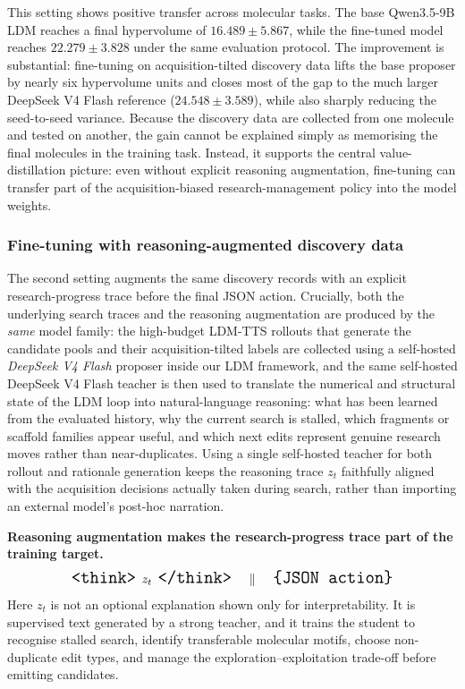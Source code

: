This setting shows positive transfer across molecular tasks. The base
Qwen3.5-9B LDM reaches a final hypervolume of $16.489\pm5.867$, while the fine-tuned model reaches
$22.279\pm3.828$ under the same evaluation protocol. The improvement is substantial: fine-tuning on
acquisition-tilted discovery data lifts the base proposer by nearly six hypervolume units and closes most of
the gap to the much larger DeepSeek V4 Flash reference ($24.548\pm3.589$), while also sharply reducing the
seed-to-seed variance. Because the discovery data are collected from one molecule and tested on another, the
gain cannot be explained simply as memorising the final molecules in the training task. Instead, it supports the
central value-distillation picture: even without explicit reasoning augmentation, fine-tuning can transfer part
of the acquisition-biased research-management policy into the model weights.

\subsubsection{Fine-tuning with reasoning-augmented discovery data}
\label{sec:finetune-with-augmentation}
The second setting augments the same discovery records with an explicit research-progress trace before the
final JSON action. Crucially, both the underlying search traces and the reasoning augmentation are produced by
the \emph{same} model family: the high-budget LDM-TTS rollouts that generate the candidate pools and their
acquisition-tilted labels are collected using a self-hosted \emph{DeepSeek V4 Flash} proposer inside our LDM
framework, and the same self-hosted DeepSeek V4 Flash teacher is then used to translate the numerical and
structural state of the LDM loop into natural-language reasoning: what has been learned from the evaluated
history, why the current search is stalled, which fragments or scaffold families appear useful, and which next
edits represent genuine research moves rather than near-duplicates. Using a single self-hosted teacher for both
rollout and rationale generation keeps the reasoning trace $z_t$ faithfully aligned with the acquisition
decisions actually taken during search, rather than importing an external model's post-hoc narration.

\begin{tcolorbox}[
    enhanced,
    breakable,
    colframe=discgreenline,
    colback=discgreen!18,
    boxrule=0.9pt,
    arc=4pt,
    left=8pt,
    right=8pt,
    top=7pt,
    bottom=7pt
]
{\large\bfseries Reasoning augmentation makes the research-progress trace part of the training target.}
\[
  {\Large 
\texttt{<think>}~z_t~\texttt{</think>}
  \quad\Vert\quad
  \texttt{\{JSON action\}}}
\]
\small
Here $z_t$ is not an optional explanation shown only for interpretability. It is supervised text generated by a
strong teacher, and it trains the student to recognise stalled search, identify transferable molecular motifs,
choose non-duplicate edit types, and manage the exploration--exploitation trade-off before emitting candidates.
\end{tcolorbox}

